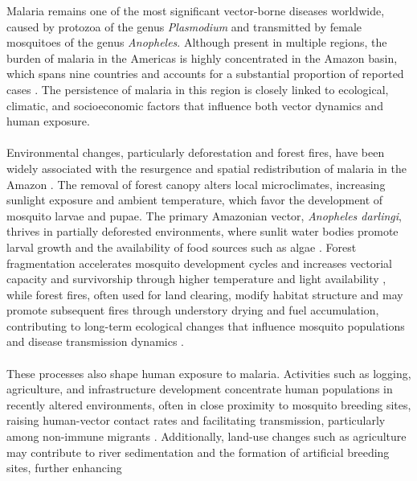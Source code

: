 \documentclass[a4paper,fleqn]{cas-dc}
\begin{document}
Malaria remains one of the most significant vector-borne diseases worldwide, caused by
protozoa of the genus \textit{Plasmodium} and transmitted by female mosquitoes of the
genus \textit{Anopheles}. Although present in multiple regions, the burden of malaria in the Americas is
highly concentrated in the Amazon basin, which spans nine countries and accounts for a substantial proportion of reported
cases \cite{pimenta_orfano_bahia_duarte_rios-velasquez_melo_pessoa_oliveira_campos_villegas_etal_2015}.
The persistence of malaria in this region is closely linked to ecological, climatic, and socioeconomic factors
that influence both vector dynamics and human exposure.
\\\\
Environmental changes, particularly deforestation and forest fires, have been widely associated with the
resurgence and spatial redistribution of malaria in the Amazon \cite{Norris2004}. The removal of forest canopy
alters local microclimates, increasing sunlight exposure and ambient temperature, which favor the development of
mosquito larvae and pupae. The primary Amazonian vector, \textit{Anopheles darlingi}, thrives in partially
deforested environments, where sunlit water bodies promote larval growth and the availability of food sources
such as algae \cite{infoAnopheles, article_alteracoesambientais}. Forest fragmentation accelerates mosquito
development cycles and increases vectorial capacity and survivorship through higher temperature and light
availability \cite{article_alteracoesambientais, Anthropogenic_Landscape}, while forest fires, often used for
land clearing, modify habitat structure and may promote subsequent fires through understory drying and fuel
accumulation, contributing to long-term ecological changes that influence mosquito populations and disease
transmission dynamics \cite{Future_of_Deforestation, Relationship_between_fires_and_defor, Conservation_Policy}.
\\\\
These processes also shape human exposure to malaria. Activities such as logging, agriculture, and infrastructure
development concentrate human populations in recently altered environments, often in close proximity to mosquito
breeding sites, raising human-vector contact rates and facilitating transmission, particularly among non-immune
migrants \cite{silva-nunes_malaria_amazon_2008, DASILVANUNES2012281}. Additionally, land-use changes such as
agriculture may contribute to river sedimentation and the formation of artificial breeding sites, further enhancing
\end{document}
